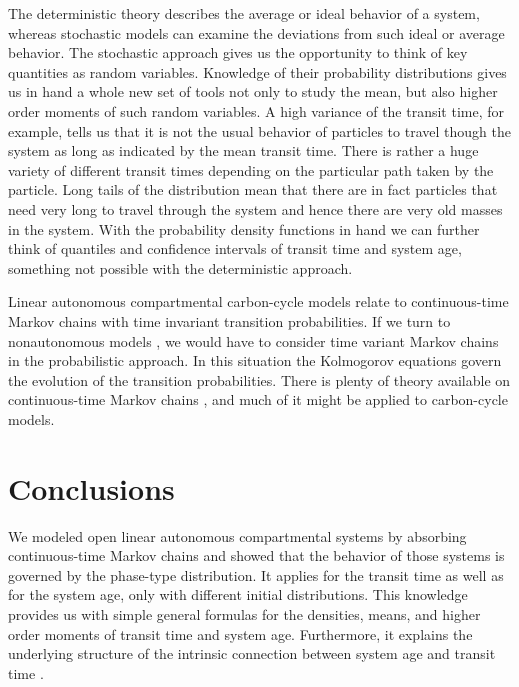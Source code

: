 \documentclass[smallextended]{svjour3}
\begin{document}

The deterministic theory describes the average or ideal behavior of a system, whereas stochastic models can examine the deviations from such ideal or average behavior.
The stochastic approach gives us the opportunity to think of key quantities as random variables.
Knowledge of their probability distributions gives us in hand a whole new set of tools not only to study the mean, but also higher order moments of such random variables.
A high variance of the transit time, for example, tells us that it is not the usual behavior of particles to travel though the system as long as indicated by the mean transit time.
There is rather a huge variety of different transit times depending on the particular path taken by the particle.
Long tails of the distribution mean that there are in fact particles that need very long to travel through the system and hence there are very old masses in the system.
With the probability density functions in hand we can further think of quantiles and confidence intervals of transit time and system age, something not possible with the deterministic approach.

Linear autonomous compartmental carbon-cycle models relate to continuous-time Markov chains with time invariant transition probabilities.
If we turn to nonautonomous models \citep{Rasmussen2016JMB}, we would have to consider time variant Markov chains in the probabilistic approach.
In this situation the Kolmogorov equations govern the evolution of the transition probabilities.
There is plenty of theory available on continuous-time Markov chains \citep{Norris1997, Ross2010}, and much of it might be applied to carbon-cycle models.

\section{Conclusions}
We modeled open linear autonomous compartmental systems by absorbing continuous-time Markov chains and showed that the behavior of those systems is governed by the phase-type distribution.
It applies for the transit time as well as for the system age, only with different initial distributions.
This knowledge provides us with simple general formulas for the densities, means, and higher order moments of transit time and system age.
Furthermore, it explains the underlying structure of the intrinsic connection between system age and transit time \citep{bolin1973Tellus}.
\end{document}
